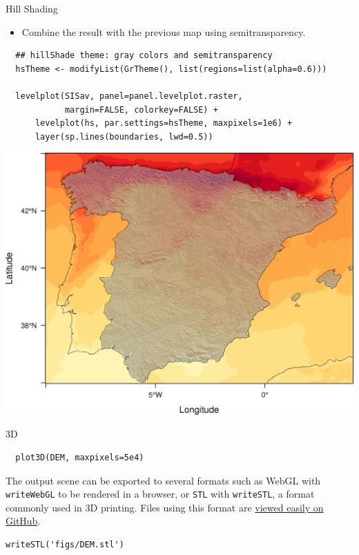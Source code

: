 \documentclass[xcolor={usenames,svgnames,dvipsnames}]{beamer}
\begin{document}
\begin{frame}[fragile,label=sec-2-7]{Hill Shading}
 \begin{itemize}
\item Combine the result with the previous map using semitransparency.
\end{itemize}

\lstset{language=R,label= ,caption= ,numbers=none}
\begin{lstlisting}
  ## hillShade theme: gray colors and semitransparency
  hsTheme <- modifyList(GrTheme(), list(regions=list(alpha=0.6)))
  
  levelplot(SISav, panel=panel.levelplot.raster,
            margin=FALSE, colorkey=FALSE) +
      levelplot(hs, par.settings=hsTheme, maxpixels=1e6) +
      layer(sp.lines(boundaries, lwd=0.5))
\end{lstlisting}
\end{frame}

\begin{frame}[label=sec-2-8]{}
\includegraphics[width=.9\linewidth]{figs/hillShading.png}
\end{frame}

\begin{frame}[fragile,label=sec-2-9]{3D}
 \lstset{language=R,label= ,caption= ,numbers=none}
\begin{lstlisting}
  plot3D(DEM, maxpixels=5e4)
\end{lstlisting}

The output scene can be exported to several formats such as WebGL with
\texttt{writeWebGL} to be rendered in a browser, or \texttt{STL} with \texttt{writeSTL}, a
format commonly used in 3D printing. Files using this format are
\href{https://github.com/oscarperpinan/spacetime-vis/blob/gh-pages/images/DEM.stl}{viewed easily on GitHub}.

\lstset{language=R,label= ,caption= ,numbers=none}
\begin{lstlisting}
writeSTL('figs/DEM.stl')
\end{lstlisting}
\end{frame}
\end{document}

